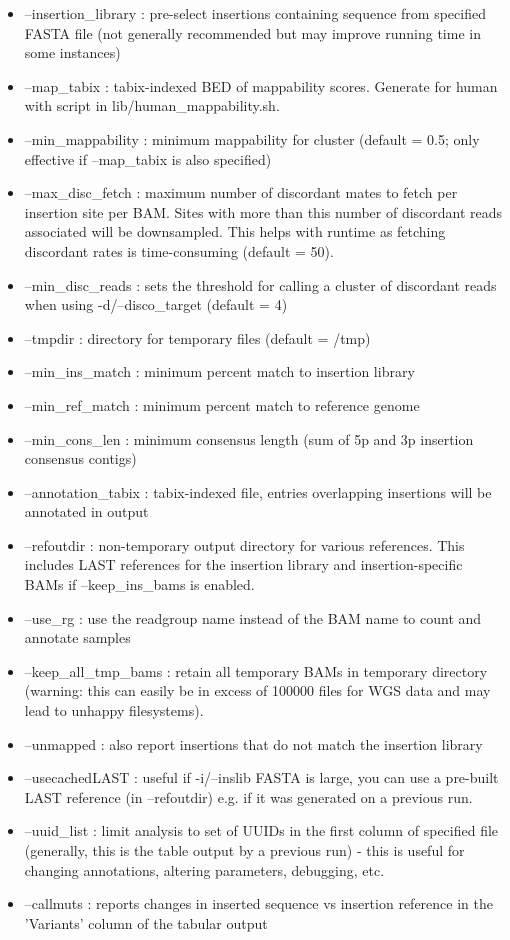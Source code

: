 \documentclass[letterpaper,11pt]{article}
\begin{document}
\begin{itemize}
\item --insertion\_library : pre-select insertions containing sequence from specified FASTA file (not generally recommended but may improve running time in some instances)
\item --map\_tabix : tabix-indexed BED of mappability scores. Generate for human with script in lib/human\_mappability.sh.
\item --min\_mappability : minimum mappability for cluster (default = 0.5; only effective if --map\_tabix is also specified)
\item --max\_disc\_fetch : maximum number of discordant mates to fetch per insertion site per BAM. Sites with more than this number of discordant reads associated will be downsampled. This helps with runtime as fetching discordant rates is time-consuming (default = 50).
\item --min\_disc\_reads : sets the threshold for calling a cluster of discordant reads when using -d/--disco\_target (default = 4)
\item --tmpdir : directory for temporary files (default = /tmp)
\item --min\_ins\_match : minimum percent match to insertion library
\item --min\_ref\_match : minimum percent match to reference genome
\item --min\_cons\_len : minimum consensus length (sum of 5p and 3p insertion consensus contigs)
\item --annotation\_tabix : tabix-indexed file, entries overlapping insertions will be annotated in output
\item --refoutdir : non-temporary output directory for various references. This includes LAST references for the insertion library and insertion-specific BAMs if --keep\_ins\_bams is enabled.
\item --use\_rg : use the readgroup name instead of the BAM name to count and annotate samples
\item --keep\_all\_tmp\_bams : retain all temporary BAMs in temporary directory (warning: this can easily be in excess of 100000 files for WGS data and may lead to unhappy filesystems).
\item --unmapped : also report insertions that do not match the insertion library
\item --usecachedLAST : useful if -i/--inslib FASTA is large, you can use a pre-built LAST reference (in --refoutdir) e.g. if it was generated on a previous run.
\item --uuid\_list : limit analysis to set of UUIDs in the first column of specified file (generally, this is the table output by a previous run) - this is useful for changing annotations, altering parameters, debugging, etc.
\item --callmuts : reports changes in inserted sequence vs insertion reference in the 'Variants' column of the tabular output
\end{itemize}
\end{document}
